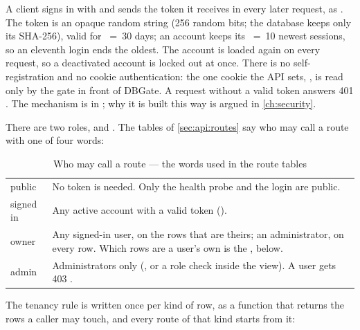 A client signs in with  and sends the token it receives in every
later request, as . The token is an opaque random string
(256 random bits; the database keeps only its SHA-256), valid for ~=~30 days;
an account keeps its ~=~10 newest sessions, so an eleventh login ends
the oldest. The account is loaded again on every request, so a deactivated account is locked
out at once. There is no self-registration and no cookie authentication: the one cookie the
API sets, , is read only by the gate in front of DBGate. A request
without a valid token answers 401 . The mechanism is in
; why it is built this way is argued in \cref{ch:security}.

There are two roles,  and . The tables of \cref{sec:api:routes} say who
may call a route with one of four words:

\begin{table}[H]
\caption{Who may call a route --- the words used in the route tables}\label{tab:api:who}
\begin{tabularx}{\textwidth}{@{}L{22mm}Y@{}}
\toprule
{} &  \\
\midrule
public & No token is needed. Only the health probe and the login are public. \\
signed in & Any active account with a valid token (). \\
owner & Any signed-in user, on the rows that are theirs; an administrator, on every row. Which
  rows are a user's own is the , below. \\
admin & Administrators only (, or a role check inside the view).
  A user gets 403 . \\
\bottomrule
\end{tabularx}
\end{table}

The tenancy rule is written once per kind of row, as a function that returns the rows a caller
may touch, and every route of that kind starts from it:

